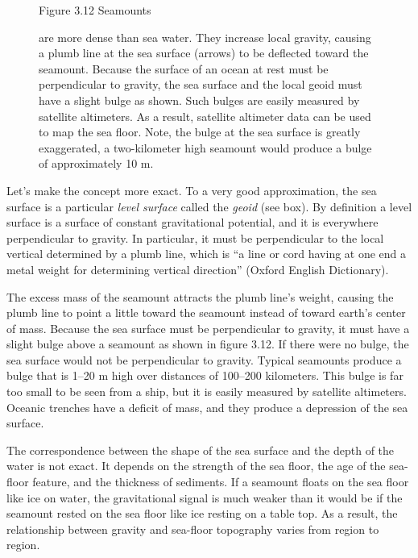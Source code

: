 \begin{figure} [t!]
{{\begin{minipage}{11.5cm}
\vspace{5ex}
\footnotesize
Figure 3.12 Seamounts \rule{0mm}{6ex}are more dense than sea water. They increase local gravity, causing a plumb line at the sea surface (arrows)
to be deflected toward the seamount. Because the surface of an ocean at rest must
be perpendicular to gravity, the sea surface and the local geoid must have a
slight bulge as shown. Such bulges are easily measured by satellite altimeters.
As a result, satellite altimeter data can be used to map the sea floor. Note, the
bulge at the sea surface is greatly exaggerated, a two-kilometer high seamount
would produce a bulge of approximately 10 m.
\label{fig:geoidsketch}
\vspace{0.7ex}
\end{minipage}
}}
\vspace{-4ex}
\end{figure}

Let's make the concept more exact. To a very good approximation, the sea surface is
a particular \textit{level surface} called the
\textit{geoid} (see box). By definition a level surface is a surface of constant
gravitational potential, and it is everywhere perpendicular to gravity. In particular, it must be perpendicular to the local vertical determined by a plumb line, which is ``a line or cord having at one end a metal weight for determining vertical direction'' (Oxford English Dictionary).

The excess mass of the seamount attracts the plumb line's weight, causing the
plumb line to point a little toward the seamount instead of toward earth's center
of mass. Because the sea surface must be perpendicular to gravity, it must
have a slight bulge above a seamount as shown in figure 3.12. If there were no
bulge, the sea surface would not be perpendicular to gravity. Typical seamounts
produce a bulge that is 1--20 m high over distances of 100--200 kilometers.
This bulge is far too small to be seen from a ship, but it is easily
measured by satellite altimeters. Oceanic trenches have a deficit of mass, and they
produce a depression of the sea surface.

The correspondence between the shape of the sea surface and the depth of the water
is not exact. It depends on the strength of the sea floor, the age of the
sea-floor feature, and the thickness of sediments. If a seamount floats on the sea floor like ice on water, the gravitational signal is much weaker than it would be if the seamount rested on
the sea floor like ice resting on a table top. As a result, the relationship
between gravity and sea-floor topography varies from region to region.

